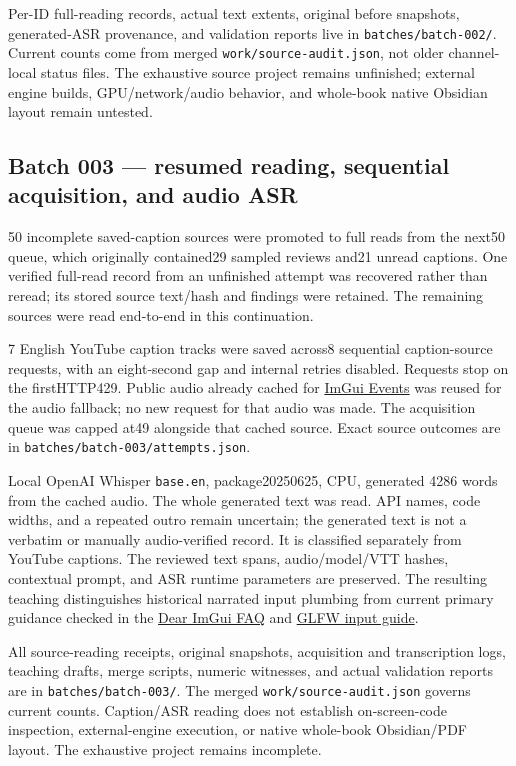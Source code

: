 Per-ID full-reading records, actual text extents, original before snapshots, generated-ASR provenance, and validation reports live in \texttt{batches/batch-002/}. Current counts come from merged \texttt{work/source-audit.json}, not older channel-local status files. The exhaustive source project remains unfinished; external engine builds, GPU/network/audio behavior, and whole-book native Obsidian layout remain untested.

\subsection{Batch 003 --- resumed reading, sequential acquisition, and audio ASR}\label{appendix-877738f6f4d2-batch-003-resumed-reading-sequential-acquisition-and-audio-asr}

50 incomplete saved-caption sources were promoted to full reads from the next50 queue, which originally contained29 sampled reviews and21 unread captions. One verified full-read record from an unfinished attempt was recovered rather than reread; its stored source text/hash and findings were retained. The remaining sources were read end-to-end in this continuation.

7 English YouTube caption tracks were saved across8 sequential caption-source requests, with an eight-second gap and internal retries disabled. Requests stop on the firstHTTP429. Public audio already cached for \href{https://www.youtube.com/watch?v=yBP1gSbQPPM}{ImGui Events} was reused for the audio fallback; no new request for that audio was made. The acquisition queue was capped at49 alongside that cached source. Exact source outcomes are in \texttt{batches/batch-003/attempts.json}.

Local OpenAI Whisper \texttt{base.en}, package20250625, CPU, generated 4286 words from the cached audio. The whole generated text was read. API names, code widths, and a repeated outro remain uncertain; the generated text is not a verbatim or manually audio-verified record. It is classified separately from YouTube captions. The reviewed text spans, audio/model/VTT hashes, contextual prompt, and ASR runtime parameters are preserved. The resulting teaching distinguishes historical narrated input plumbing from current primary guidance checked in the \href{https://github.com/ocornut/imgui/blob/master/docs/FAQ.md}{Dear ImGui FAQ} and \href{https://www.glfw.org/docs/latest/input_guide.html}{GLFW input guide}.

All source-reading receipts, original snapshots, acquisition and transcription logs, teaching drafts, merge scripts, numeric witnesses, and actual validation reports are in \texttt{batches/batch-003/}. The merged \texttt{work/source-audit.json} governs current counts. Caption/ASR reading does not establish on-screen-code inspection, external-engine execution, or native whole-book Obsidian/PDF layout. The exhaustive project remains incomplete.

